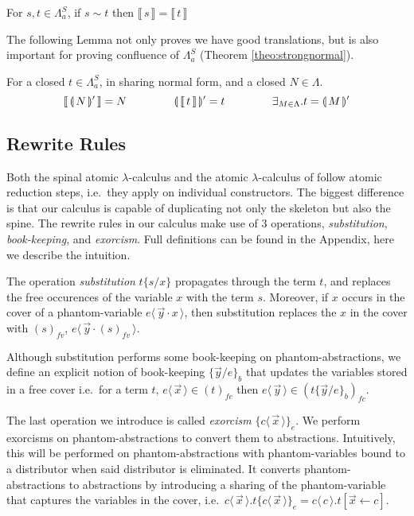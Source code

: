 \documentclass[a4paper,UKenglish,cleveref, autoref]{lipics-v2019}
\newcommand{\FALC}{\Lambda^{S}_{a}}
\newcommand{\fv}[1]{(#1)_{fv}}
\newcommand{\fc}[1]{(#1)_{fc}}
\newcommand{\fake}[3]{#1 \langle \, #2 \, \rangle . #3}
\newcommand{\share}[3]{#1 [#2 \leftarrow #3]}
\newcommand{\fakedist}[2]{#1 \langle \, #2 \, \rangle}
\newcommand{\sub}[3]{#1 \{ #2 / #3 \}}
\newcommand{\psub}[3]{#1 \{ #2 / #3 \}_{b}}
\newcommand{\exor}[3]{#1 \{ \fakedist{#2}{#3} \}_{e}}
\newcommand{\readback}[2]{\llbracket \, #1 \, \rrbracket}
\newcommand{\compile}[1]{\llparenthesis \, #1 \, \rrparenthesis}
\newcommand{\trans}[1]{\llbracket \, #1 \, \rrbracket}
\begin{document}
\begin{proposition}
\label{lem:preservedenotationsim}
For $s, t \in \FALC$, if $s \sim t$ then $\trans{s} = \trans{t}$
\end{proposition}

\noindent The following Lemma not only proves we have good translations, but is also important for proving confluence of $\FALC$ (Theorem \ref{theo:strongnormal}).

\begin{lemma}
\label{lem:preserve1to1correspondance}
For a closed $t \in \FALC$, in sharing normal form, and a closed $N \in \Lambda$.
$$\readback{\compile{N}'}{I} = N \hspace{1.5cm} \compile{\readback{t}{I}}' = t \hspace{1.5cm} \exists_{ M \in \Lambda} . t = \compile{M}'$$
\end{lemma}

\subsection{Rewrite Rules}

Both the spinal atomic $\lambda$-calculus and the atomic $\lambda$-calculus of \cite{Gundersen-Heijltjes-Parigot-2013-LICS} follow atomic reduction steps, i.e.\ they apply on individual constructors. The biggest difference is that our calculus is capable of duplicating not only the skeleton but also the spine. The rewrite rules in our calculus make use of 3 operations, \emph{substitution}, \emph{book-keeping}, and \emph{exorcism}. Full definitions can be found in the Appendix, here we describe the intuition.

The operation \emph{substitution} $\sub{t}{s}{x}$ propagates through the term $t$, and replaces the free occurences of the variable $x$ with the term $s$. Moreover, if $x$ occurs in the cover of a phantom-variable $\fakedist{e}{\vec{y} \cdot x}$, then substitution replaces the $x$ in the cover with $\fv{s}$, $\fakedist{e}{\vec{y} \cdot \fv{s}}$. 

Although substitution performs some book-keeping on phantom-abstractions, we define an explicit notion of book-keeping $\psub{}{\vec{y}}{e}$ that updates the variables stored in a free cover i.e.\ for a term $t$, $\fakedist{e}{\vec{x}} \in \fc{t}$ then $\fakedist{e}{\vec{y}} \in \fc{\psub{t}{\vec{y}}{e}}$. 

The last operation we introduce is called \emph{exorcism} $\exor{}{c}{\vec{x}}$. We perform exorcisms on phantom-abstractions to convert them to abstractions. Intuitively, this will be performed on phantom-abstractions with phantom-variables bound to a distributor when said distributor is eliminated. It converts phantom-abstractions to abstractions by introducing a sharing of the phantom-variable that captures the variables in the cover, i.e.\ $\fake{c}{\vec{x}}{t} \exor{}{c}{\vec{x}} = \fake{c}{c}{\share{t}{\vec{x}}{c}}$. 
\end{document}
